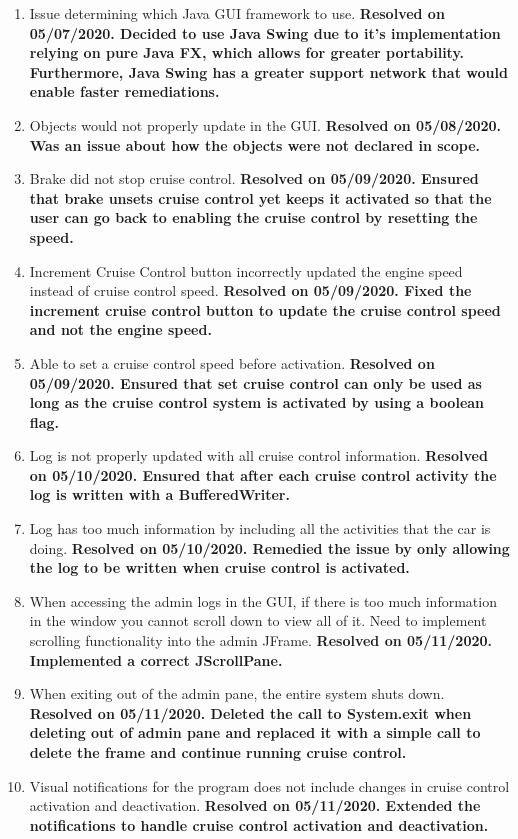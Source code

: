 \documentclass[preprint,11pt,3p]{article}
\begin{document}
\begin{enumerate} 
	\item Issue determining which Java GUI framework to use. \textbf{Resolved on 05/07/2020. Decided to use Java Swing due to it's implementation relying on pure Java FX, which allows for greater portability. Furthermore, Java Swing has a greater support network that would enable faster remediations.}
	\item Objects would not properly update in the GUI. \textbf{Resolved on 05/08/2020. Was an issue about how the objects were not declared in scope.}
	\item Brake did not stop cruise control. \textbf{Resolved on 05/09/2020. Ensured that brake unsets cruise control yet keeps it activated so that the user can go back to enabling the cruise control by resetting the speed.}
	\item Increment Cruise Control button incorrectly updated the engine speed instead of cruise control speed. \textbf{Resolved on 05/09/2020. Fixed the increment cruise control button to update the cruise control speed and not the engine speed.}
	\item Able to set a cruise control speed before activation. \textbf{Resolved on 05/09/2020. Ensured that set cruise control can only be used as long as the cruise control system is activated by using a boolean flag.}
	\item Log is not properly updated with all cruise control information. \textbf{Resolved on 05/10/2020. Ensured that after each cruise control activity the log is written with a BufferedWriter.}
	\item Log has too much information by including all the activities that the car is doing. \textbf{Resolved on 05/10/2020. Remedied the issue by only allowing the log to be written when cruise control is activated.}
	\item When accessing the admin logs in the GUI, if there is too much information in the window you cannot scroll down to view all of it. Need to implement scrolling functionality into the admin JFrame. \textbf{Resolved on 05/11/2020. Implemented a correct JScrollPane.} 
	\item When exiting out of the admin pane, the entire system shuts down. \textbf{Resolved on 05/11/2020. Deleted the call to System.exit when deleting out of admin pane and replaced it with a simple call to delete the frame and continue running cruise control.}
	\item Visual notifications for the program does not include changes in cruise control activation and deactivation. \textbf{Resolved on 05/11/2020. Extended the notifications to handle cruise control activation and deactivation.}

\end{enumerate}
\end{document}
